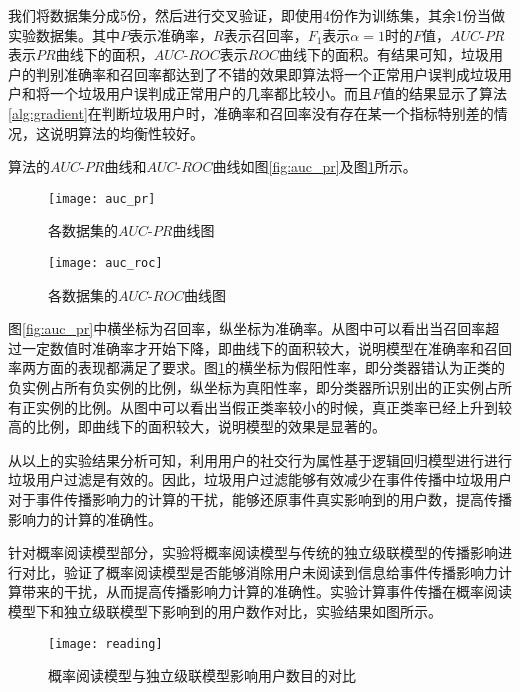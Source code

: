 我们将数据集分成5份，然后进行交叉验证，即使用4份作为训练集，其余1份当做实验数据集。其中$P$表示准确率，$R$表示召回率，$F_1$表示$\alpha = 1$时的$F$值，$AUC$-$PR$表示$PR$曲线下的面积，$AUC$-$ROC$表示$ROC$曲线下的面积。有结果可知，垃圾用户的判别准确率和召回率都达到了不错的效果即算法将一个正常用户误判成垃圾用户和将一个垃圾用户误判成正常用户的几率都比较小。而且$F$值的结果显示了算法\ref{alg:gradient}在判断垃圾用户时，准确率和召回率没有存在某一个指标特别差的情况，这说明算法的均衡性较好。

算法的$AUC$-$PR$曲线和$AUC$-$ROC$曲线如图\ref{fig:auc_pr}及图\ref{fig:auc_roc}所示。

\begin{figure}[!ht]
   \begin{minipage}{0.48\textwidth}
     \centering
     \texttt{[image: auc\_pr]}
     \caption{各数据集的$AUC$-$PR$曲线图}
     \label{fig:auc_pr}
   \end{minipage}
   \hfill
   \begin {minipage}{0.48\textwidth}
     \centering
     \texttt{[image: auc\_roc]}
     \caption{各数据集的$AUC$-$ROC$曲线图}
     \label{fig:auc_roc}
   \end{minipage}
\end{figure}

图\ref{fig:auc_pr}中横坐标为召回率，纵坐标为准确率。从图中可以看出当召回率超过一定数值时准确率才开始下降，即曲线下的面积较大，说明模型在准确率和召回率两方面的表现都满足了要求。图\ref{fig:auc_roc}的横坐标为假阳性率，即分类器错认为正类的负实例占所有负实例的比例，纵坐标为真阳性率，即分类器所识别出的正实例占所有正实例的比例。从图中可以看出当假正类率较小的时候，真正类率已经上升到较高的比例，即曲线下的面积较大，说明模型的效果是显著的。

从以上的实验结果分析可知，利用用户的社交行为属性基于逻辑回归模型进行进行垃圾用户过滤是有效的。因此，垃圾用户过滤能够有效减少在事件传播中垃圾用户对于事件传播影响力的计算的干扰，能够还原事件真实影响到的用户数，提高传播影响力的计算的准确性。

针对概率阅读模型部分，实验将概率阅读模型与传统的独立级联模型的传播影响进行对比，验证了概率阅读模型是否能够消除用户未阅读到信息给事件传播影响力计算带来的干扰，从而提高传播影响力计算的准确性。实验计算事件传播在概率阅读模型下和独立级联模型下影响到的用户数作对比，实验结果如图所示。

\begin{figure}[!ht]
    \centering
    \texttt{[image: reading]}
    \caption{概率阅读模型与独立级联模型影响用户数目的对比}
    \label{fig:reading}
\end{figure}


